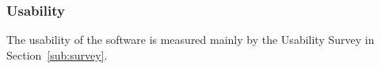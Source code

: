 \documentclass[12pt, titlepage]{article}
\begin{document}
					
					


\subsubsection{Usability}

The usability of the software is measured mainly by the Usability Survey in Section~\ref{sub:survey}.


    					
    					
    					
    					


\end{document}
